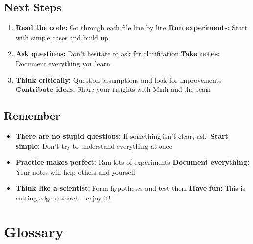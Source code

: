 \documentclass[12pt]{article}
\begin{document}
\subsection{Next Steps}

\begin{enumerate}
    \item \textbf{Read the code:} Go through each file line by line
    \textbf{Run experiments:} Start with simple cases and build up
    \item \textbf{Ask questions:} Don't hesitate to ask for clarification
    \textbf{Take notes:} Document everything you learn
    \item \textbf{Think critically:} Question assumptions and look for improvements
    \textbf{Contribute ideas:} Share your insights with Minh and the team
\end{enumerate}

\subsection{Remember}

\begin{itemize}
    \item \textbf{There are no stupid questions:} If something isn't clear, ask!
    \textbf{Start simple:} Don't try to understand everything at once
    \item \textbf{Practice makes perfect:} Run lots of experiments
    \textbf{Document everything:} Your notes will help others and yourself
    \item \textbf{Think like a scientist:} Form hypotheses and test them
    \textbf{Have fun:} This is cutting-edge research - enjoy it!
\end{itemize}

\section{Glossary}
\end{document}
